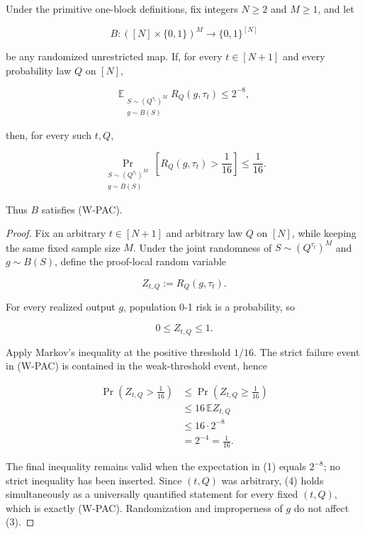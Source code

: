 \begin{lemma}\label{lem:step-003-markov-bridge}
Under the primitive one-block definitions, fix integers \(N\ge2\) and
\(M\ge1\), and let

\[
B:([N]\times\{0,1\})^M\to\{0,1\}^{[N]}
\]

be any randomized unrestricted map. If, for every \(t\in[N+1]\) and every
probability law \(Q\) on \([N]\),

\[
\mathbb E_{\substack{S\sim(Q^{\tau_t})^M\\g\sim B(S)}}
  R_Q(g,\tau_t)
\le 2^{-8},
\tag{1}
\]

then, for every such \(t,Q\),

\[
\Pr_{\substack{S\sim(Q^{\tau_t})^M\\g\sim B(S)}}
  \left[R_Q(g,\tau_t)>\frac1{16}\right]
\le\frac1{16}.
\tag{2}
\]

Thus \(B\) satisfies (W-PAC).
\end{lemma}

\begin{proof}
Fix an arbitrary \(t\in[N+1]\) and arbitrary law \(Q\) on \([N]\), while
keeping the same fixed sample size \(M\). Under the joint randomness of
\(S\sim(Q^{\tau_t})^M\) and \(g\sim B(S)\), define the proof-local random
variable

\[
Z_{t,Q}:=R_Q(g,\tau_t).
\]

For every realized output \(g\), population 0-1 risk is a probability, so

\[
0\le Z_{t,Q}\le1.
\tag{3}
\]

Apply Markov's inequality at the positive threshold \(1/16\). The strict
failure event in (W-PAC) is contained in the weak-threshold event, hence

\[
\begin{aligned}
\Pr\!\left(Z_{t,Q}>\frac1{16}\right)
&\le \Pr\!\left(Z_{t,Q}\ge\frac1{16}\right)\\
&\le 16\,\mathbb E Z_{t,Q}\\
&\le 16\cdot2^{-8}\\
&=2^{-4}
=\frac1{16}.
\end{aligned}
\tag{4}
\]

The final inequality remains valid when the expectation in (1) equals
\(2^{-8}\); no strict inequality has been inserted. Since \((t,Q)\) was
arbitrary, (4) holds simultaneously as a universally quantified statement
for every fixed \((t,Q)\), which is exactly (W-PAC). Randomization and
improperness of \(g\) do not affect (3). \end{proof}

